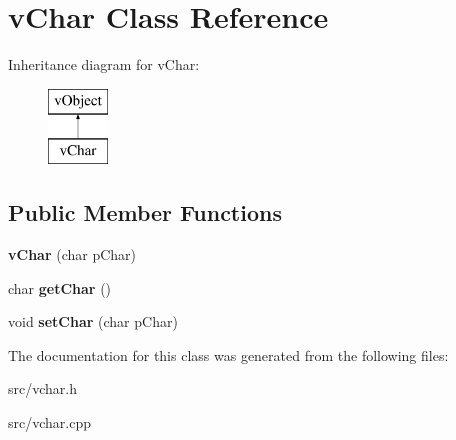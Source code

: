 \hypertarget{classv_char}{\section{v\-Char Class Reference}
\label{classv_char}
}
Inheritance diagram for v\-Char\-:\begin{figure}[H]
\begin{center}
\leavevmode
\includegraphics[height=2.000000cm]{classv_char}
\end{center}
\end{figure}
\subsection*{Public Member Functions}
\begin{DoxyCompactItemize}
\item 
\hypertarget{classv_char_a19df5432691316152d7ffc6aafc7b969}{{\bfseries v\-Char} (char p\-Char)}\label{classv_char_a19df5432691316152d7ffc6aafc7b969}

\item 
\hypertarget{classv_char_ad2fc23601dfbc5c86d40ed743eef8c20}{char {\bfseries get\-Char} ()}\label{classv_char_ad2fc23601dfbc5c86d40ed743eef8c20}

\item 
\hypertarget{classv_char_a2cdfcf5694453be6d4835ad198864009}{void {\bfseries set\-Char} (char p\-Char)}\label{classv_char_a2cdfcf5694453be6d4835ad198864009}

\end{DoxyCompactItemize}


The documentation for this class was generated from the following files\-:\begin{DoxyCompactItemize}
\item 
src/vchar.\-h\item 
src/vchar.\-cpp\end{DoxyCompactItemize}
